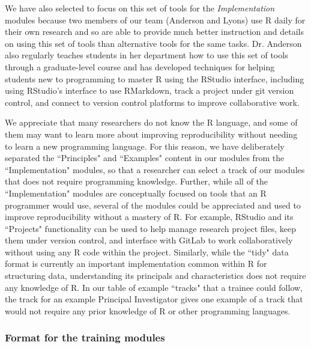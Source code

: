 \documentclass[pdftex,english,11pt,parskip=half]{scrartcl}
\begin{document}
We have also selected to focus on this set of tools for
the \textit{Implementation} modules because two members of our team (Anderson
and Lyons) use R daily for their own research and so are able to provide much
better instruction and details on using this set of tools than alternative tools
for the same tasks. Dr. Anderson also regularly teaches students in her
department how to use this set of tools through a graduate-level course and has
developed techniques for helping students new to programming to master R using
the RStudio interface, including using RStudio's interface to use RMarkdown,
track a project under git version control, and connect to version control
platforms to improve collaborative work. 

We appreciate that many researchers do not know the R language, and
some of them may want to learn more about improving reproducibility without
needing to learn a new programming language. For this reason, we have
deliberately separated the ``Principles" and ``Examples" content in our modules
from the ``Implementation" modules, so that a researcher can select a track of
our modules that does not require programming knowledge. Further, while all of
the ``Implementation" modules are conceptually focused on tools that an R
programmer would use, several of the modules could be appreciated and used to
improve reproducibility without a mastery of R. For example, RStudio and its
``Projects" functionality can be used to help manage research project files,
keep them under version control, and interface with GitLab to work
collaboratively without using any R code within the project. Similarly, while
the ``tidy" data format is currently an important implementation common within R
for structuring data, understanding its principals and characteristics does not
require any knowledge of R. In our table of example ``tracks" that a trainee
could follow, the track for an example Principal Investigator gives one example
of a track that would not require any prior knowledge of R or other programming
languages.   







\subsubsection*{Format for the training modules}
\end{document}
